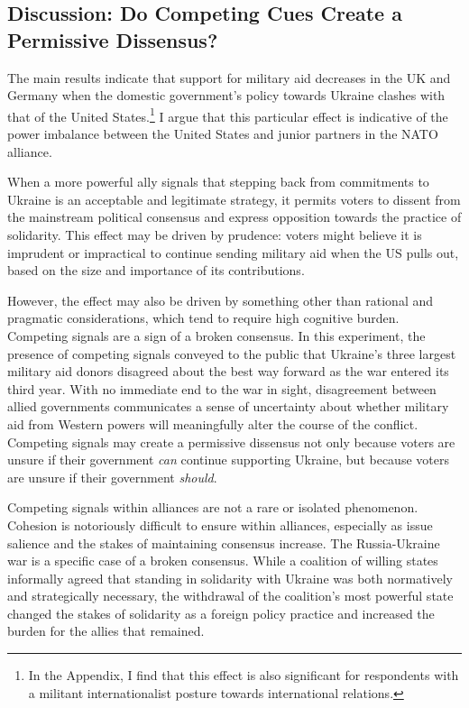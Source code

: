 \subsection{Discussion: Do Competing Cues Create a Permissive Dissensus?}
The main results indicate that support for military aid decreases in the UK and Germany when the domestic government's policy towards Ukraine clashes with that of the United States.\footnote{In the Appendix, I find that this effect is also significant for respondents with a militant internationalist posture towards international relations.} I argue that this particular effect is indicative of the power imbalance between the United States and junior partners in the NATO alliance. 

When a more powerful ally signals that stepping back from commitments to Ukraine is an acceptable and legitimate strategy, it permits voters to dissent from the mainstream political consensus and express opposition towards the practice of solidarity. This effect may be driven by prudence: voters might believe it is imprudent or impractical to continue sending military aid when the US pulls out, based on the size and importance of its contributions. 

However, the effect may also be driven by something other than rational and pragmatic considerations, which tend to require high cognitive burden. Competing signals are a sign of a broken consensus. In this experiment, the presence of competing signals conveyed to the public that Ukraine's three largest military aid donors disagreed about the best way forward as the war entered its third year. With no immediate end to the war in sight, disagreement between allied governments communicates a sense of uncertainty about whether military aid from Western powers will meaningfully alter the course of the conflict. Competing signals may create a permissive dissensus not only because voters are unsure if their government \emph{can} continue supporting Ukraine, but because voters are unsure if their government \emph{should}. 

Competing signals within alliances are not a rare or isolated phenomenon. Cohesion is notoriously difficult to ensure within alliances, especially as issue salience and the stakes of maintaining consensus increase. The Russia-Ukraine war is a specific case of a broken consensus. While a coalition of willing states informally agreed that standing in solidarity with Ukraine was both normatively and strategically necessary, the withdrawal of the coalition's most powerful state changed the stakes of solidarity as a foreign policy practice and increased the burden for the allies that remained.   

